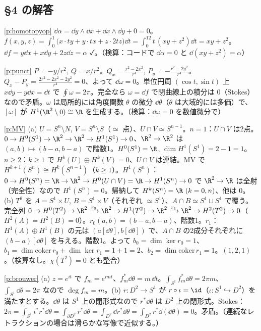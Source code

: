 \subsection*{§4 の解答}
\begin{sol}{\ref{p:homotopyop}}
$\dd\alpha=\dd y\wedge\dd x+\dd x\wedge\dd y+0=0$。$f(x,y,z)=\int_0^1\bigl(x\cdot ty+y\cdot tx+z\cdot2tz\bigr)\dd t=\int_0^12t\,(xy+z^2)\dd t=xy+z^2$。$\dd f=y\dd x+x\dd y+2z\dd z=\alpha$ ✓。（検算：コードで $\dd\alpha=0$ と $\dd(xy+z^2)=\alpha$）
\end{sol}
\begin{sol}{\ref{p:punct}}
$P=-y/r^2,\ Q=x/r^2$。$Q_x=\frac{r^2-2x^2}{r^4}$, $P_y=-\frac{r^2-2y^2}{r^4}$。$Q_x-P_y=\frac{2r^2-2x^2-2y^2}{r^4}=0$、よって $\dd\omega=0$。単位円周 $(\cos t,\sin t)$ 上 $x\dd y-y\dd x=\dd t$ で $\oint\omega=2\pi$。完全なら $\omega=\dd f$ で閉曲線上の積分は $0$（Stokes）なので矛盾。$\omega$ は局所的には角度関数 $\theta$ の微分 $\dd\theta$（$\theta$ は大域的には多価）で、$[\omega]$ が $H^1(\R^2\setminus0)\cong\R$ を生成する。（検算：$\dd\omega=0$ を数値微分で）
\end{sol}
\begin{sol}{\ref{p:MV}}
(a) $U=S^n\setminus N$, $V=S^n\setminus S$（$\simeq$ 点）、$U\cap V\simeq S^{n-1}$。$n=1$：$U\cap V$ は2点。$0\to H^0(S^1)\to\R^2\to\R^2\to H^1(S^1)\to0$、$\R^2\to\R^2$ は $(a,b)\mapsto(b-a,b-a)$ で階数1。$H^0(S^1)=\R$, $\dim H^1(S^1)=2-1=1$。$n\ge2$：$k\ge1$ で $H^k(U)\oplus H^k(V)=0$、$U\cap V$ は連結。MV で $H^{k+1}(S^n)\cong H^k(S^{n-1})$（$k\ge1$）。$H^1(S^n)$：$0\to H^0(S^n)=\R\to\R^2\to H^0(U\cap V)=\R\to H^1(S^n)\to0$ で $\R^2\to\R$ は全射（完全性）なので $H^1(S^n)=0$。帰納して $H^k(S^n)=\R\ (k=0,n)$、他は $0$。
(b) $T^2$ を $A=S^1\times U$, $B=S^1\times V$（それぞれ $\simeq S^1$）、$A\cap B\simeq S^1\sqcup S^1$ で覆う。完全列 $0\to H^0(T^2)\to\R^2\xrightarrow{r_0}\R^2\to H^1(T^2)\to\R^2\xrightarrow{r_1}\R^2\to H^2(T^2)\to0$（$H^2(A)=H^2(B)=0$）。$r_0(a,b)=(b-a,b-a)$、階数1。$r_1$：$H^1(A)\oplus H^1(B)$ の元は $(a[\dd\theta],b[\dd\theta])$ で、$A\cap B$ の2成分それぞれに $(b-a)[\dd\theta]$ を与える。階数1。よって $b_0=\dim\ker r_0=1$、$b_1=\dim\mathrm{coker}\,r_0+\dim\ker r_1=1+1=2$、$b_2=\dim\mathrm{coker}\,r_1=1$。$(1,2,1)$。（検算なし。$\chi(T^2)=0$ とも整合）
\end{sol}
\begin{sol}{\ref{p:brouwer}}
(a) $z=e^{it}$ で $f_m=e^{imt}$、$f_m^*\dd\theta=m\,\dd t$。$\int_{S^1}f_m^*\dd\theta=2\pi m$、$\int_{S^1}\dd\theta=2\pi$ なので $\deg f_m=m$。(b) $r:D^2\to S^1$ が $r\circ\iota=\id$（$\iota:S^1\hookrightarrow D^2$）を満たすとする。$\dd\theta$ は $S^1$ 上の閉形式なので $r^*\dd\theta$ は $D^2$ 上の閉形式。Stokes：$2\pi=\int_{S^1}\iota^*r^*\dd\theta=\int_{\partial D^2}r^*\dd\theta=\int_{D^2}\dd r^*\dd\theta=\int_{D^2}r^*\dd(\dd\theta)=0$。矛盾。（連続なレトラクションの場合は滑らかな写像で近似する\tC。）
\end{sol}

